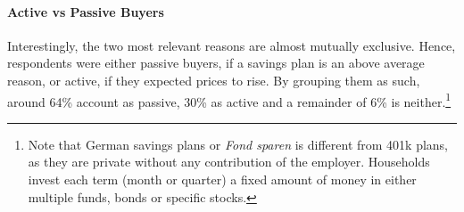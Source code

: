\documentclass[ProjectABM]{subfiles}
\begin{document}




\paragraph{Active vs Passive Buyers}
Interestingly, the two most relevant reasons are almost mutually exclusive. Hence, respondents were either passive buyers, if a savings plan is an above average reason, or active, if they expected prices to rise. By grouping them as such, around 64\% account as passive, 30\% as active and a remainder of 6\% is neither.\footnote{Note that German savings plans or \textit{Fond sparen} is different from 401k plans, as they are private without any contribution of the employer. Households invest each term (month or quarter) a fixed amount of money in either multiple funds, bonds or specific stocks.}

\end{document}
